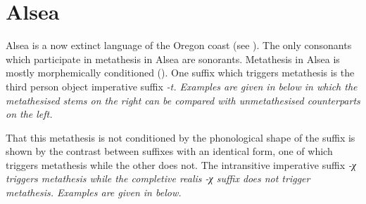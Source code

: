 \section{Alsea}\label{sec:Als}
Alsea is a now extinct language of the Oregon coast (see ).
The only consonants which participate in metathesis in Alsea are sonorants.
Metathesis in Alsea is mostly morphemically conditioned ().
One suffix which triggers metathesis is the third person object imperative suffix \it{-t}.
Examples are given in  below
in which the metathesised stems on the right
can be compared with unmetathesised counterparts on the left.

\begin{exe}
	\label{ex:AlsMorphemicMet}
\end{exe}

That this metathesis is not conditioned by the phonological shape of the suffix
is shown by the contrast between suffixes with an identical form,
one of which triggers metathesis while the other does not.
The intransitive imperative suffix \it{-χ} triggers metathesis
while the completive realis \it{-χ} suffix does not trigger metathesis.
Examples are given in  below.

\begin{exe}
	\label{ex:AlsMorphemicMet2}
\end{exe}

